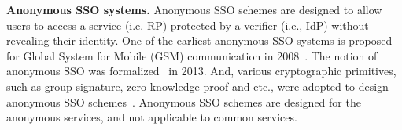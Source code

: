 \noindent\textbf{Anonymous SSO systems.} Anonymous SSO schemes are designed to allow users to access a service (i.e. RP) protected by a verifier (i.e., IdP) without revealing their identity. One of the earliest anonymous SSO systems is proposed for Global System for Mobile (GSM) communication in 2008~\cite{ElmuftiWRR08}.
The notion of anonymous SSO was formalized~\cite{WangWS13} in 2013.
And, various cryptographic primitives, such as group signature, zero-knowledge proof and etc., were adopted to design anonymous SSO schemes~\cite{WangWS13,HanCSTW18}.
Anonymous SSO schemes are designed for the anonymous services, and not applicable to common services.
